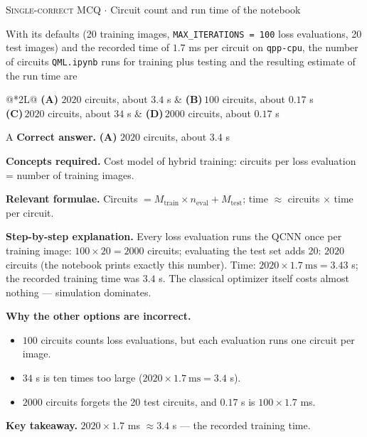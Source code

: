 \documentclass[11pt,a4paper]{article}
\newcommand{\optlabel}[1]{\textbf{(#1)}}
\newcommand{\correctlabel}[1]{\textcolor{okgreen}{\textbf{(#1)}\,\ding{51}}}
\newenvironment{qitem}[1]{\begin{list}{}{\setlength{\leftmargin}{3.3em}\setlength{\labelwidth}{3.1em}%
  \setlength{\labelsep}{0.2em}\setlength{\topsep}{3pt}\setlength{\parsep}{3pt}}\item[\textbf{Q.#1}\hfill]}{\end{list}}
\newcommand{\qsep}{\par\vspace{2pt}{\color{black!15}\hrule}\vspace{4pt}}
\newcommand{\qmeta}[2]{{\footnotesize\color{black!60}\textsc{#1} \;$\cdot$\; #2}\par}
\begin{document}
\begin{qitem}{53}
\qmeta{Single-correct MCQ}{Circuit count and run time of the notebook}
With its defaults (20 training images, \texttt{MAX\_ITERATIONS = 100} loss evaluations, 20 test images) and the
recorded time of $1.7$ ms per circuit on \texttt{qpp-cpu}, the number of circuits \texttt{QML.ipynb} runs for training plus testing
and the resulting estimate of the run time are
\par\smallskip\noindent\begin{tabularx}{\linewidth}{@{}*{2}{L}@{}}
\correctlabel{A}\,$2020$ circuits, about $3.4$ s & \optlabel{B}\,$100$ circuits, about $0.17$ s \\[3pt]
\optlabel{C}\,$2020$ circuits, about $34$ s & \optlabel{D}\,$2000$ circuits, about $0.17$ s
\end{tabularx}
\end{qitem}
\begin{solbox}{A}
\textbf{\color{brand}Correct answer.} \textcolor{okgreen}{\textbf{(A)}} $2020$ circuits, about $3.4$ s

\textbf{\color{brand}Concepts required.} Cost model of hybrid training: circuits per loss evaluation = number of training images.

\textbf{\color{brand}Relevant formulae.} Circuits $= M_{\text{train}}\times n_{\text{eval}} + M_{\text{test}}$; time $\approx$ circuits $\times$ time per circuit.

\textbf{\color{brand}Step-by-step explanation.} Every loss evaluation runs the QCNN once per training image: $100\times20 = 2000$ circuits; evaluating the test set adds 20:
$2020$ circuits (the notebook prints exactly this number). Time: $2020\times1.7\ \text{ms} = 3.43$ s; the recorded training time was
$3.4$ s. The classical optimizer itself costs almost nothing --- simulation dominates.

\textbf{\color{brand}Why the other options are incorrect.}
\begin{itemize}[leftmargin=2.4em, itemsep=1pt, topsep=2pt]
\item[\textbf{(B)}] $100$ circuits counts loss evaluations, but each evaluation runs one circuit per image.
\item[\textbf{(C)}] $34$ s is ten times too large ($2020\times1.7\ \text{ms} = 3.4$ s).
\item[\textbf{(D)}] $2000$ circuits forgets the 20 test circuits, and $0.17$ s is $100\times1.7$ ms.
\end{itemize}
\textbf{\color{brand}Key takeaway.} $2020\times1.7$ ms $\approx 3.4$ s --- the recorded training time.
\end{solbox}
\qsep
\end{document}
